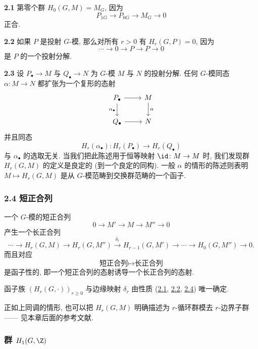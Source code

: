 \noindent{}\hypertarget{item:ii.2.1}{}\textbf{2.1} 第零个群 $H_0(G,M)=M_G$, 因为
\[
 P_{1G}\to P_{0G}\to M_G\to 0
\]
正合.

\noindent{}\hypertarget{item:ii.2.2}{}\textbf{2.2} 如果 $P$ 是投射 $G$-模, 那么对所有 $r>0$ 有 $H_r(G,P)=0$, 因为
\[
 \cdots\to 0\to P\to P\to 0
\]
是 $P$ 的一个投射分解.

\noindent{}\hypertarget{item:ii.2.3}{}\textbf{2.3} 设 $P_\bullet\to M$ 与 $Q_\bullet\to N$ 为 $G$-模 $M$ 与 $N$ 的投射分解. 任何 $G$-模同态 $\alpha\colon M\to N$ 都扩张为一个复形的态射
\[
 \begin{tikzcd}
 P_\bullet \ar[r] \ar[d, "\alpha_\bullet"'] & M \ar[d, "\alpha"] \\
 Q_\bullet \ar[r] & N
 \end{tikzcd}
\]
并且同态
\[
 H_r(\alpha_\bullet)\colon H_r(P_\bullet)\to H_r(Q_\bullet)
\]
与 $\alpha_\bullet$ 的选取无关. 当我们把此陈述用于恒等映射 $\id\colon M\to M$ 时, 我们发现群 $H_r(G,M)$ 的定义是良定的 (到一个良定的同构). 一般 $\alpha$ 的情形的陈述则表明 $M\mapsto H_r(G,M)$ 是从 $G$-模范畴到交换群范畴的一个函子.

\hypertarget{item:ii.2.4}{}\subsubsection*{2.4 短正合列}

一个 $G$-模的短正合列
\[
 0\to M'\to M\to M''\to 0
\]
产生一个长正合列
\[
 \cdots\to H_r(G,M)\to H_r(G,M'')\xrightarrow{\delta_r} H_{r-1}(G,M')\to\cdots\to H_0(G,M'')\to 0.
\]
而且对应
\[
 \text{短正合列}\mapsto\text{长正合列}
\]
是函子性的, 即一个短正合列的态射诱导一个长正合列的态射.

\setcounter{theorem}{4}
\begin{remark}\label{rem:ii.2.5}
函子族 $(H_r(G,\cdot))_{r\ge 0}$ 与边缘映射 $\delta_r$ 由性质 (\hyperlink{item:ii.2.1}{2.1}, \hyperlink{item:ii.2.2}{2.2}, \hyperlink{item:ii.2.4}{2.4}) 唯一确定.
\end{remark}

正如上同调的情形, 也可以把 $H_r(G,M)$ 明确描述为 $r$-循环群模去 $r$-边界子群 —— 见本章后面的参考文献.

\subsubsection*{群 $H_1(G,\Z)$}

